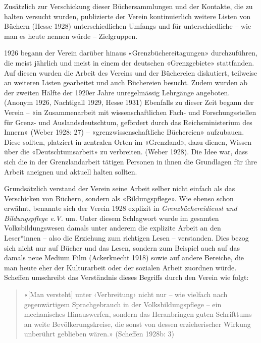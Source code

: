 \documentclass[a4paper,
fontsize=11pt,
oneside,
numbers=noperiodatend,
parskip=half-,
bibliography=totoc,
final
]{scrartcl}
\begin{document}
Zusätzlich zur Verschickung dieser Büchersammlungen und der Kontakte,
die zu halten versucht wurden, publizierte der Verein kontinuierlich
weitere Listen von Büchern (Hesse 1928) unterschiedlichen Umfangs und
für unterschiedliche -- wie man es heute nennen würde -- Zielgruppen.

1926 begann der Verein darüber hinaus «Grenzbüchereitagungen»
durchzuführen, die meist jährlich und meist in einem der deutschen
«Grenzgebiete» stattfanden. Auf diesen wurden die Arbeit des Vereins und
der Büchereien diskutiert, teilweise an weiteren Listen gearbeitet und
auch Büchereien besucht. Zudem wurden ab der zweiten Hälfte der 1920er
Jahre unregelmässig Lehrgänge angeboten. (Anonym 1926, Nachtigall 1929,
Hesse 1931) Ebenfalls zu dieser Zeit begann der Verein -- «in
Zusammenarbeit mit wissenschaftlichen Fach- und Forschungsstellen für
Grenz- und Auslandsdeutschtum, gefördert durch das Reichsministerium des
Innern» (Weber 1928: 27) -- «grenzwissenschaftliche Büchereien»
aufzubauen. Diese sollten, platziert in zentralen Orten im «Grenzland»,
dazu dienen, Wissen über die «Deutschtumsarbeit» zu verbreiten. (Weber
1928). Die Idee war, dass sich die in der Grenzlandarbeit tätigen
Personen in ihnen die Grundlagen für ihre Arbeit aneignen und aktuell
halten sollten.

Grundsätzlich verstand der Verein seine Arbeit selber nicht einfach als
das Verschicken von Büchern, sondern als «Bildungspflege». Wie ebenso
schon erwähnt, benannte sich der Verein 1928 explizit in
\emph{Grenzbüchereidienst und Bildungspflege e.V.} um. Unter diesem
Schlagwort wurde im gesamten Volksbildungswesen damals unter anderem die
explizite Arbeit an den Leser*innen -- also die Erziehung zum richtigen
Lesen -- verstanden. Dies bezog sich nicht nur auf Bücher und das Lesen,
sondern zum Beispiel auch auf das damals neue Medium Film (Ackerknecht
1918) sowie auf andere Bereiche, die man heute eher der Kulturarbeit
oder der sozialen Arbeit zuordnen würde. Scheffen umschreibt das
Verständnis dieses Begriffs durch den Verein wie folgt:

\begin{quote}
«{[}Man versteht{]} unter ‹Verbreitung› nicht nur -- wie vielfach nach
gegenwärtigem Sprachgebrauch in der Volksbildungspflege -- ein
mechanisches Hinauswerfen, sondern das Heranbringen guten Schrifttums an
weite Bevölkerungskreise, die sonst von dessen erzieherischer Wirkung
unberührt geblieben wären.» (Scheffen 1928b: 3)
\end{quote}
\end{document}
